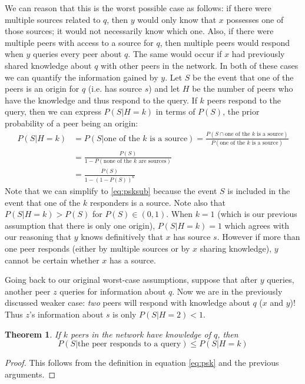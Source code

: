 \documentclass{article}
\newcommand{\eqnref}[1]{equation \eqref{eq:#1}}
\newtheorem{theorem}{Theorem}
\begin{document}
We can reason that this is the worst possible case as follows: if there were
multiple sources related to $q$, then $y$ would only know that $x$ possesses one
of those sources; it would not necessarily know which one. Also, if there were
multiple peers with access to a source for $q$, then multiple peers would
respond when $y$ queries every peer about $q$. The same would occur if $x$ had
previously shared knowledge about $q$ with other peers in the network. In both
of these cases we can quantify the information gained by $y$. Let $S$ be the
event that one of the peers is an origin for $q$ (i.e. has
source $s$) and let $H$ be the number of peers who have the knowledge and thus
respond to the query.
If $k$ peers respond to the query, then we can express $P(S|H=k)$ in terms of
$P(S)$, the prior probability of a peer being an origin:
\begin{align}
	P(S|H=k)&=P(S|\text{one of the $k$ is a source})=\frac{P(S\cap\text{one of
	the $k$ is a source})}{P(\text{one of the $k$ is a source})}\nonumber\\
	&=\frac{P(S)}{1-P(\text{none of the $k$ are sources})}\label{eq:psksub}\\
	&=\frac{P(S)}{1-(1-P(S))^k}\label{eq:psk}
\end{align}
Note that we can simplify to \eqref{eq:psksub} because the event $S$ is included
in the event that one of the $k$ responders is a source. Note also that
$P(S|H=k)>P(S)$ for $P(S)\in(0,1)$. When $k=1$ (which is our previous assumption
that there is only one origin), $P(S|H=k)=1$ which agrees with our reasoning
that $y$ knows definitively that $x$ has source $s$. However if more than one peer
responds (either by multiple sources or by $x$ sharing knowledge), $y$ cannot be
certain whether $x$ has a source.

Going back to our original worst-case assumptions, suppose that after $y$
queries, another peer $z$ queries for information about $q$. Now we are in the
previously discussed weaker case: {\it two} peers will respond with knowledge
about $q$ ($x$ and $y$)! Thus $z$'s information about $s$ is only $P(S|H=2)<1$.

\begin{theorem}
	If $k$ peers in the network have knowledge of $q$, then
	\begin{equation*}
		P(S|\text{the peer responds to a query})\le P(S|H=k)
	\end{equation*}
\end{theorem}
\begin{proof}
	This follows from the definition in \eqnref{psk} and the previous arguments.
\end{proof}
\end{document}
